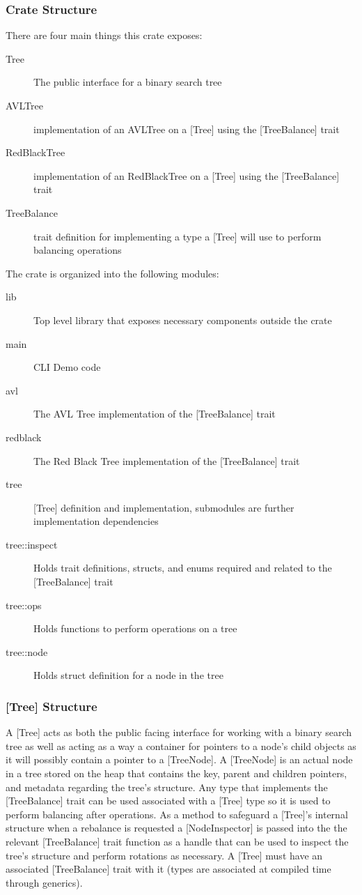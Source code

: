 \documentclass[12pt, letterpaper]{article}
\begin{document}
\subsubsection{Crate Structure}
There are four main things this crate exposes:
\begin{description}
    \item[Tree] The public interface for a binary search tree
    \item[AVLTree] implementation of an AVLTree on a [Tree] using the [TreeBalance] trait
    \item[RedBlackTree] implementation of an RedBlackTree on a [Tree] using the [TreeBalance] trait
    \item[TreeBalance] trait definition for implementing a type a [Tree] will use to perform balancing operations
\end{description}
\hfill \break
\noindent The crate is organized into the following modules:
\begin{description}
    \item[lib] Top level library that exposes necessary components outside the crate
    \item[main] CLI Demo code
    \item[avl] The AVL Tree implementation of the [TreeBalance] trait
    \item[redblack] The Red Black Tree implementation of the [TreeBalance] trait
    \item[tree] [Tree] definition and implementation, submodules are further implementation dependencies
    \item[tree::inspect] Holds trait definitions, structs, and enums required and related to the [TreeBalance] trait
    \item[tree::ops] Holds functions to perform operations on a tree
    \item[tree::node] Holds struct definition for a node in the tree
\end{description}

\subsubsection{[Tree] Structure}
A [Tree] acts as both the public facing interface for working with a binary search tree as well as
acting as a way a container for pointers to a node's child objects as it will possibly contain
a pointer to a [TreeNode].  A [TreeNode] is an actual node in a tree stored on the heap that contains the
key, parent and children pointers, and metadata regarding the tree's structure.  Any type that implements the [TreeBalance] trait
can be used associated with a [Tree] type so it is used to perform balancing after operations.
As a method to safeguard a [Tree]'s internal structure when a rebalance is requested a [NodeInspector] is passed into the
the relevant [TreeBalance] trait function as a handle that can be used to inspect the tree's structure and perform rotations as necessary.
A [Tree] must have an associated [TreeBalance] trait with it (types are associated at compiled time through generics).
\end{document}
